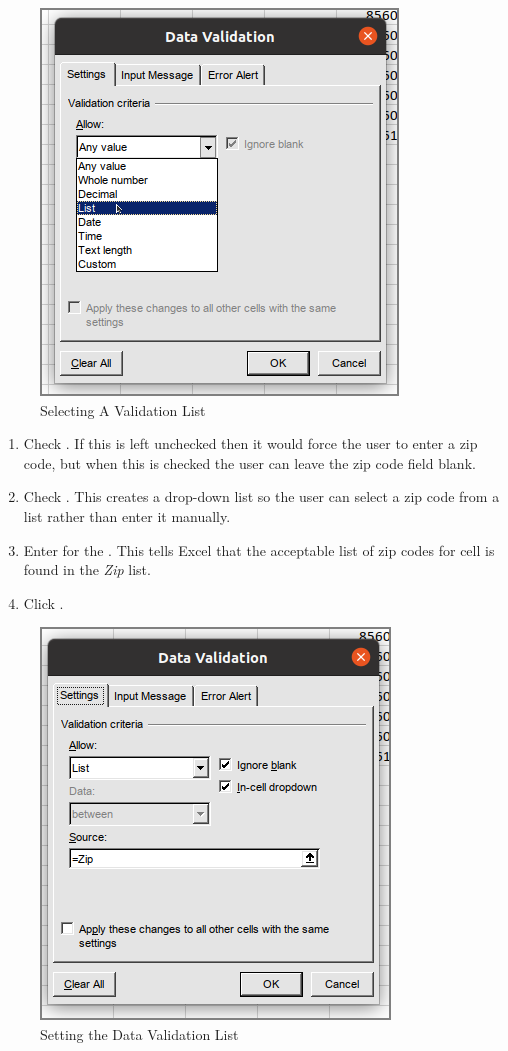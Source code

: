 \begin{figure}[H]
	\centering
	\includegraphics[width=\maxwidth{.95\linewidth}]{gfx/ch07_fig36}
	\caption{Selecting A Validation List}
	\label{07:fig36}
\end{figure}

\begin{enumerate}[resume]	
	\item Check . If this is left unchecked then it would force the user to enter a zip code, but when this is checked the user can leave the zip code field blank.
	\item Check . This creates a drop-down list so the user can select a zip code from a list rather than enter it manually.
	\item Enter  for the . This tells Excel that the acceptable list of zip codes for cell  is found in the \textit{Zip} list.
	\item Click .
\end{enumerate}

\begin{figure}[H]
	\centering
	\includegraphics[width=\maxwidth{.95\linewidth}]{gfx/ch07_fig37}
	\caption{Setting the Data Validation List}
	\label{07:fig37}
\end{figure}

